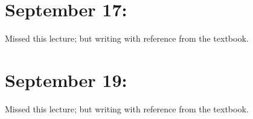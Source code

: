 \documentclass[11pt]{article}
\begin{document}
\newpage
\section{September 17: }

\begin{note}
  {Missed this lecture; but writing with reference from the textbook.}
\end{note}


\newpage
\section{September 19: }

\begin{note}
  {Missed this lecture; but writing with reference from the textbook.}
\end{note}







\newpage
\vskip 0.5cm
\end{document}
